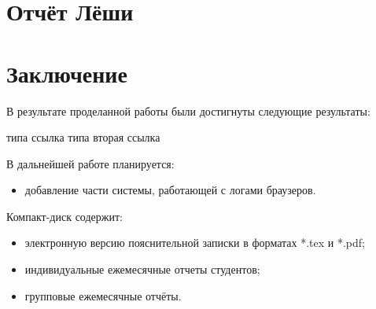 \documentclass[russian,utf8,14pt,simple]{eskdtext}
\begin{document}


\newpage
\section{Отчёт Лёши}



\newpage
\section{Заключение}
В результате проделанной работы были достигнуты следующие результаты:

типа ссылка \cite{qtdoc}
типа вторая ссылка \cite{fedotovforenzika}

В дальнейшей работе планируется:
\begin{itemize}
\item добавление части системы, работающей с логами браузеров.
\end{itemize}

\newpage
\renewcommand{\refname}{Список использованных источников}


Компакт-диск содержит: 
\begin{itemize}
\item электронную версию пояснительной записки в форматах *.tex и *.pdf;
\item индивидуальные ежемесячные отчеты студентов;
\item групповые ежемесячные отчёты.
\end{itemize}
\end{document}
